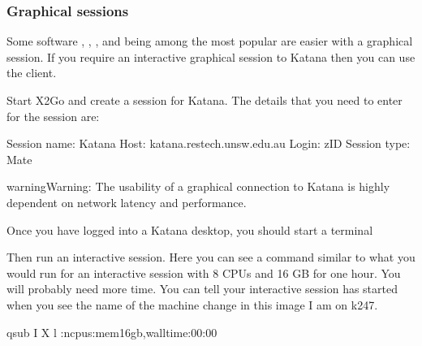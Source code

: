 \documentclass[letterpaper,10pt,english]{sphinxmanual}
\begin{document}
\subsubsection{Graphical sessions}
\label{\detokenize{using_katana/accessing_katana:graphical-sessions}}\label{\detokenize{using_katana/accessing_katana:graphical-session}}
Some software \sphinxhyphen{} , {\hyperref[\detokenize{software/python-jupyter-notebooks:jupyter-notebooks}]{}}, , and {\hyperref[\detokenize{software/r:r-and-rstudio}]{}} being among the most popular \sphinxhyphen{} are easier with a graphical session. If you require an interactive graphical session to Katana then you can use the  client.

Start X2Go and create a session for Katana. The details that you need to enter for the session are:

\begin{sphinxVerbatim}[commandchars=\\\{\}]
Session name: Katana
Host: katana.restech.unsw.edu.au
Login: zID
Session type: Mate
\end{sphinxVerbatim}

\noindent{}

\begin{sphinxadmonition}{warning}{Warning:}
The usability of a graphical connection to Katana is highly dependent on network latency and performance.
\end{sphinxadmonition}

Once you have logged into a Katana desktop, you should start a terminal

\noindent{}

Then run an interactive session. Here you can see a command similar to what you would run for an interactive session with 8 CPUs and 16 GB for one hour. You will probably need more time. You can tell your interactive session has started when you see the name of the machine change \sphinxhyphen{} in this image I am on k247.

\begin{sphinxVerbatim}[commandchars=\\\{\}]
qsub \PYGZhy{}I \PYGZhy{}X \PYGZhy{}l :ncpus:mem16gb,walltime:00:00
\end{sphinxVerbatim}
\end{document}
